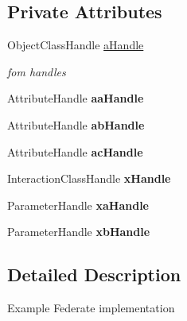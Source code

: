 \subsection*{Private Attributes}
\begin{DoxyCompactItemize}
\item 
\hypertarget{class_example_c_p_p_federate_a0a0ce0cd597402f43b466766a3bd80a3}{
ObjectClassHandle \hyperlink{class_example_c_p_p_federate_a0a0ce0cd597402f43b466766a3bd80a3}{aHandle}}
\label{class_example_c_p_p_federate_a0a0ce0cd597402f43b466766a3bd80a3}

\begin{DoxyCompactList}\small\item\em fom handles \item\end{DoxyCompactList}\item 
\hypertarget{class_example_c_p_p_federate_a0aa9a8fe9e608c94ed28e6ba8f9cec40}{
AttributeHandle {\bfseries aaHandle}}
\label{class_example_c_p_p_federate_a0aa9a8fe9e608c94ed28e6ba8f9cec40}

\item 
\hypertarget{class_example_c_p_p_federate_afce0ad65479022ee261dc269d6869863}{
AttributeHandle {\bfseries abHandle}}
\label{class_example_c_p_p_federate_afce0ad65479022ee261dc269d6869863}

\item 
\hypertarget{class_example_c_p_p_federate_aa36baca43769fc83d21223d4e1b23dda}{
AttributeHandle {\bfseries acHandle}}
\label{class_example_c_p_p_federate_aa36baca43769fc83d21223d4e1b23dda}

\item 
\hypertarget{class_example_c_p_p_federate_a35fb74ee07c623089c1bf3a3e84cf5da}{
InteractionClassHandle {\bfseries xHandle}}
\label{class_example_c_p_p_federate_a35fb74ee07c623089c1bf3a3e84cf5da}

\item 
\hypertarget{class_example_c_p_p_federate_ae54b6dcb8713459480b0d2983d41d2cc}{
ParameterHandle {\bfseries xaHandle}}
\label{class_example_c_p_p_federate_ae54b6dcb8713459480b0d2983d41d2cc}

\item 
\hypertarget{class_example_c_p_p_federate_a537ff0d9190c2df3fdc526c0b51e0069}{
ParameterHandle {\bfseries xbHandle}}
\label{class_example_c_p_p_federate_a537ff0d9190c2df3fdc526c0b51e0069}

\end{DoxyCompactItemize}


\subsection{Detailed Description}
Example Federate implementation 

